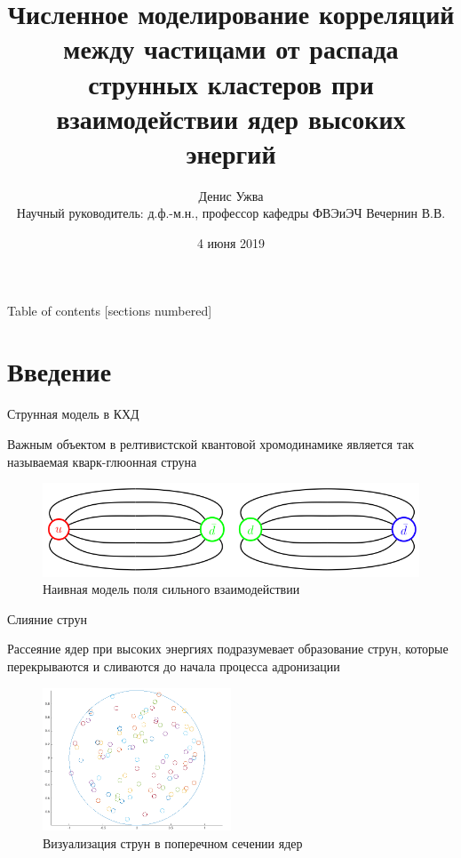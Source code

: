 \documentclass[aspectratio=43]{beamer}
\title[]{Численное моделирование корреляций между частицами от распада струнных кластеров при взаимодействии ядер высоких энергий}
\date{4 июня 2019}
\author[]{Денис Ужва \\
	  Научный руководитель: д.ф.-м.н., профессор кафедры ФВЭиЭЧ Вечернин В.В.}
\institute[]{СПбГУ, кафедра физики высоких энергий и элементарных частиц}
\begin{document}
\maketitle

\begin{frame}{Table of contents}
  [sections numbered]
  \tableofcontents[hideallsubsections]
\end{frame}



\section{Введение}

\begin{frame}{Струнная модель в КХД}
	
	Важным объектом в релтивистской квантовой хромодинамике является так называемая кварк-глюонная струна
	\begin{figure}[H]
		\includegraphics[width=\textwidth]{string}
		\caption*{Наивная модель поля сильного взаимодействии}
		\label{fig:fluctuations}
	\end{figure}

\end{frame}

\begin{frame}{Слияние струн}
	
	Рассеяние ядер при высоких энергиях подразумевает образование струн, которые перекрываются и сливаются до начала процесса адронизации
	\begin{figure}[H]
		\includegraphics[width=0.5\textwidth]{interactionarea}
		\caption*{Визуализация струн в поперечном сечении ядер}
		\label{fig:interactionarea}
	\end{figure}

\end{frame}
\end{document}

